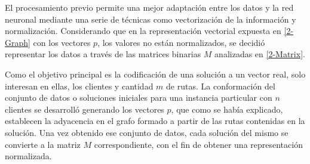 El procesamiento previo permite una mejor adaptación entre los datos y la red neuronal mediante una serie de técnicas como vectorización de la información y normalización. Considerando que en la representación vectorial expuesta en \ref{2-Graph} con los vectores $p$, los valores no están normalizados, se decidió representar los datos a través de las matrices binarias $M$ analizadas en \ref{2-Matrix}. 

Como el objetivo principal es la codificación de una solución a un vector real, solo interesan en ellas, los clientes y cantidad $m$ de rutas. La conformación del conjunto de datos o soluciones iniciales para una instancia particular con $n$ clientes se desarrolló generando los vectores $p$, que como se había explicado, establecen la adyacencia en el grafo formado a partir de las rutas contenidas en la solución. Una vez obtenido ese conjunto de datos, cada solución del mismo se convierte a la matriz $M$ correspondiente, con el fin de obtener una representación normalizada.   







